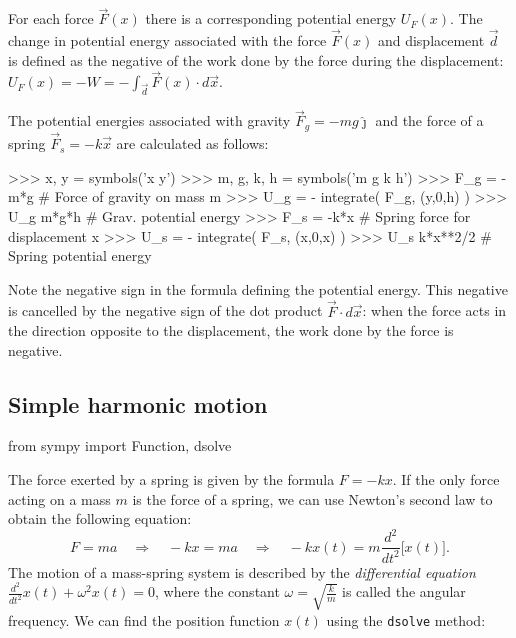 For each force $\vec{F}(x)$ there is a corresponding potential energy $U_F(x)$.					  
The change in potential energy associated with the force $\vec{F}(x)$ and displacement $\vec{d}$
is defined as the negative of the work done by the force during the displacement:					 
$U_F(x) = - W = - \int_{\vec{d}} \vec{F}(x)\cdot d\vec{x}$.

The potential energies associated with gravity $\vec{F}_g = -mg\hat{\jmath}$						
and the force of a spring $\vec{F}_s = -k\vec{x}$ are calculated as follows:						

\small
\begin{verbatimtab}
>>> x, y = symbols('x y')
>>> m, g, k, h = symbols('m g k h')
>>> F_g = -m*g             # Force of gravity on mass m 
>>> U_g = - integrate( F_g, (y,0,h) )
>>> U_g
m*g*h                      # Grav. potential energy 
>>> F_s = -k*x             # Spring force for displacement x 
>>> U_s = - integrate( F_s, (x,0,x) )
>>> U_s
k*x**2/2                   # Spring potential energy 
\end{verbatimtab}
\normalsize

\noindent
Note the negative sign in the formula defining the potential energy.
This negative is cancelled by the negative sign of the dot product $\vec{F}\cdot d\vec{x}$:
when the force acts in the direction opposite to the displacement, 
the work done by the force is negative.

\subsection{Simple harmonic motion}
\label{mechanics:simple_harmonic_motion}
\small
\begin{verbatimtab}
from sympy import Function, dsolve
\end{verbatimtab}
\normalsize

\noindent
The force exerted by a spring is given by the formula $F=-kx$.
If the only force acting on a mass $m$ is the force of a spring,
we can use Newton's second law to obtain the following equation:
\[
  F=ma  
  \quad \Rightarrow \quad
  -kx = ma   
  \quad \Rightarrow \quad
  -kx(t) = m\frac{d^2}{dt^2}\Big[x(t)\Big].
\]
The motion of a mass-spring system is described by the \emph{differential equation} $\frac{d^2}{dt^2}x(t) + \omega^2 x(t)=0$,
where the constant $\omega = \sqrt{\frac{k}{m}}$ is called the angular frequency.
We can find the position function $x(t)$ using the \texttt{dsolve} method:

